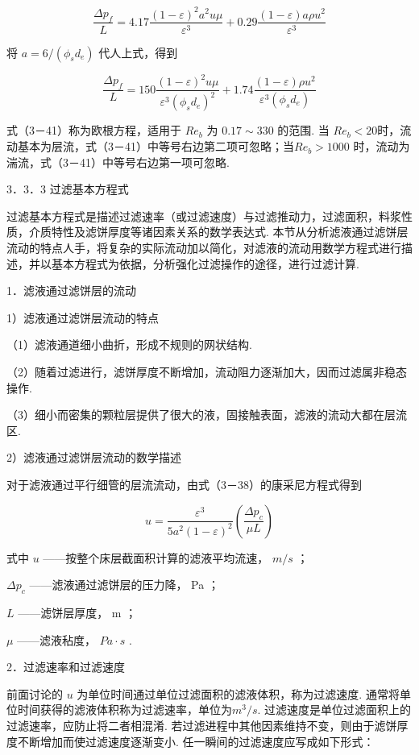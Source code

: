 \documentclass[
]{article}
\begin{document}
\[\frac{\Delta p_{f}}{L} = 4.17\frac{(1 - \varepsilon)^{2}a^{2}u\mu}{\varepsilon^{3}} + 0.29\frac{(1 - \varepsilon)a\rho u^{2}}{\varepsilon^{3}}\]

将 \(a = 6/\left( \phi_{s}d_{e} \right)\) 代人上式，得到

\[\frac{\Delta p_{f}}{L} = 150\frac{(1 - \varepsilon)^{2}u\mu}{\varepsilon^{3}\left( \phi_{s}d_{e} \right)^{2}} + 1.74\frac{(1 - \varepsilon)\rho u^{2}}{\varepsilon^{3}\left( \phi_s d_{e} \right)}\]

式（3－41）称为欧根方程，适用于 \(Re_{b}\) 为 \(0.17 \sim 330\)
的范围. 当 \(Re_{b} < 20\)时，流动基本为层流，式（3－41）中等号右边第二项可忽略；当\(Re_{b} > 1000\) 时，流动为湍流，式（3－41）中等号右边第一项可忽略. 

3．3．3 过滤基本方程式

过滤基本方程式是描述过滤速率（或过滤速度）与过滤推动力，过滤面积，料浆性质，介质特性及滤饼厚度等诸因素关系的数学表达式. 本节从分析滤液通过滤饼层流动的特点人手，将复杂的实际流动加以简化，对滤液的流动用数学方程式进行描述，并以基本方程式为依据，分析强化过滤操作的途径，进行过滤计算. 

1．滤液通过滤饼层的流动

1）滤液通过滤饼层流动的特点

（1）滤液通道细小曲折，形成不规则的网状结构. 

（2）随着过滤进行，滤饼厚度不断增加，流动阻力逐渐加大，因而过滤属非稳态操作. 

（3）细小而密集的颗粒层提供了很大的液，固接触表面，滤液的流动大都在层流区. 

2）滤液通过滤饼层流动的数学描述

对于滤液通过平行细管的层流流动，由式（3－38）的康采尼方程式得到

\[u = \frac{\varepsilon^{3}}{5a^{2}(1 - \varepsilon)^{2}}\left( \frac{\Delta p_{c}}{\mu L} \right)\]

式中 \(u\) ------按整个床层截面积计算的滤液平均流速， \(m/s\) ；

\(\Delta p_{c}\) ------滤液通过滤饼层的压力降， Pa ；

\(L\) ------滤饼层厚度， m ；

\(\mu\) ------滤液秥度， \(Pa \cdot s\) . 

2．过滤速率和过滤速度

前面讨论的 \(u\)
为单位时间通过单位过滤面积的滤液体积，称为过滤速度. 通常将单位时间获得的滤液体积称为过滤速率，单位为\(m^{3}/s\). 过滤速度是单位过滤面积上的过滤速率，应防止将二者相混淆. 若过滤进程中其他因素维持不变，则由于滤饼厚度不断增加而使过滤速度逐渐变小. 任一瞬间的过滤速度应写成如下形式：
\end{document}
